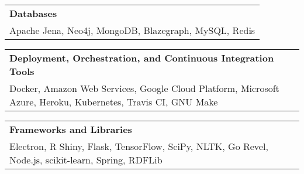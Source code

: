 \documentclass[10pt, letterpaper]{article}
\newcommand{\tabularxwidth}{\textwidth}
\begin{document}
        
            \vspace{.5em}
        

    
        \begin{tabularx}{\tabularxwidth}{X}
            \textbf{Databases} \\
            
            Apache Jena, 
            Neo4j, 
            MongoDB, 
            Blazegraph, 
            MySQL, 
            Redis \\
        \end{tabularx}

        
            \vspace{.5em}
        

    
        \begin{tabularx}{\tabularxwidth}{X}
            \textbf{Deployment, Orchestration, and Continuous Integration Tools} \\
            
            Docker, 
            Amazon Web Services, 
            Google Cloud Platform, 
            Microsoft Azure, 
            Heroku, 
            Kubernetes, 
            Travis CI, 
            GNU Make \\
        \end{tabularx}

        
            \vspace{.5em}
        

    
        \begin{tabularx}{\tabularxwidth}{X}
            \textbf{Frameworks and Libraries} \\
            
            Electron, 
            R Shiny, 
            Flask, 
            TensorFlow, 
            SciPy, 
            NLTK, 
            Go Revel, 
            Node.js, 
            scikit-learn, 
            Spring, 
            RDFLib \\
        \end{tabularx}
\end{document}
